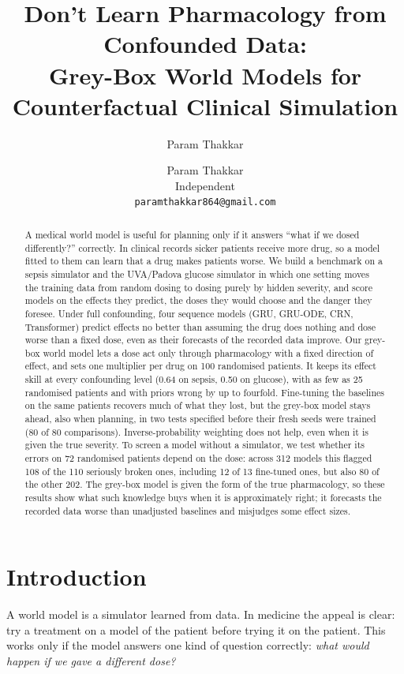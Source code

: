 \documentclass[letterpaper]{article}
\title{Don't Learn Pharmacology from Confounded Data:\\
Grey-Box World Models for Counterfactual Clinical Simulation}
\author{Param Thakkar}
\author{Param Thakkar\\Independent\\\texttt{paramthakkar864@gmail.com}}
\date{}
\begin{document}
\maketitle

\begin{abstract}
A medical world model is useful for planning only if it answers ``what if we dosed differently?'' correctly. In clinical records sicker patients receive more drug, so a model fitted to them can learn that a drug makes patients worse. We build a benchmark on a sepsis simulator and the UVA/Padova glucose simulator in which one setting moves the training data from random dosing to dosing purely by hidden severity, and score models on the effects they predict, the doses they would choose and the danger they foresee. Under full confounding, four sequence models (GRU, GRU-ODE, CRN, Transformer) predict effects no better than assuming the drug does nothing and dose worse than a fixed dose, even as their forecasts of the recorded data improve. Our grey-box world model lets a dose act only through pharmacology with a fixed direction of effect, and sets one multiplier per drug on 100 randomised patients. It keeps its effect skill at every confounding level (0.64 on sepsis, 0.50 on glucose), with as few as 25 randomised patients and with priors wrong by up to fourfold. Fine-tuning the baselines on the same patients recovers much of what they lost, but the grey-box model stays ahead, also when planning, in two tests specified before their fresh seeds were trained (80 of 80 comparisons). Inverse-probability weighting does not help, even when it is given the true severity. To screen a model without a simulator, we test whether its errors on 72 randomised patients depend on the dose: across 312 models this flagged 108 of the 110 seriously broken ones, including 12 of 13 fine-tuned ones, but also 80 of the other 202. The grey-box model is given the form of the true pharmacology, so these results show what such knowledge buys when it is approximately right; it forecasts the recorded data worse than unadjusted baselines and misjudges some effect sizes.
\end{abstract}

\section{Introduction}

A world model \citep{ha2018world,hafner2020dream} is a simulator learned from data. In medicine the appeal is clear: try a treatment on a model of the patient before trying it on the patient. This works only if the model answers one kind of question correctly: \emph{what would happen if we gave a different dose?}
\end{document}
